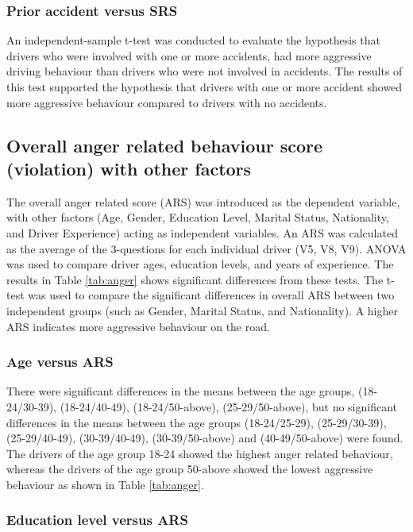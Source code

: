 \documentclass[preprint,12pt,a4paper,authoryear]{elsarticle}
\begin{document}
\subsubsection{Prior accident versus SRS}

An independent-sample t-test was conducted to evaluate the hypothesis that drivers who were involved with one or more accidents, had more aggressive driving behaviour than drivers who were not involved in accidents.  The results of this test supported the hypothesis that drivers with one or more accident showed more aggressive behaviour compared to drivers with no accidents.

\subsection{Overall anger related behaviour score (violation) with other factors}

The overall anger related score (ARS) was introduced as the dependent variable, with other factors (Age, Gender, Education Level, Marital Status, Nationality, and Driver Experience) acting as independent variables. An ARS was calculated as the average of the 3-questions for each individual driver (V5, V8, V9).  ANOVA was used to compare driver ages, education levels, and years of experience. The results in Table \ref{tab:anger} shows significant differences from these tests. The t-test was used to compare the significant differences in overall ARS between two independent groups (such as Gender, Marital Status, and Nationality). A higher ARS indicates more aggressive behaviour on the road.

\subsubsection{Age versus ARS}

There were significant differences in the means between the age groups, (18-24/30-39), (18-24/40-49), (18-24/50-above), (25-29/50-above), but no significant differences in the means between the age groups (18-24/25-29), (25-29/30-39), (25-29/40-49), (30-39/40-49),  (30-39/50-above) and (40-49/50-above) were found. The drivers of the age group 18-24 showed the highest anger related behaviour, whereas the drivers of the age group 50-above showed the lowest aggressive behaviour as shown in Table \ref{tab:anger}.

\subsubsection{Education level versus ARS}
\end{document}
